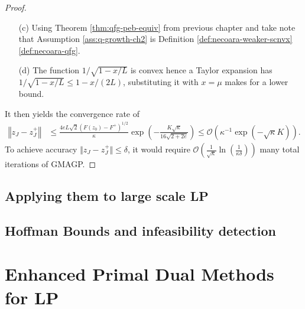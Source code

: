 \documentclass[12pt]{report}
\begin{document}
\begin{proof}
\begin{enumerate}
                \item [(c)] Using Theorem \ref{thm:qfg-peb-equiv} from previous chapter and take note that Assumption \ref{ass:q-growth-ch2} is Definition \ref{def:necoara-weaker-scnvx}\ref{def:necoara-qfg}. 
                \item [(d)] The function $1/\sqrt{1 - x/L}$ is convex hence a Taylor expansion has $1/\sqrt{1 - x/L} \le 1 - x/(2L) $, substituting it with $x = \mu$ makes for a lower bound. 
            \end{enumerate}
            It then yields the convergence rate of 
            \begin{align*}
                \left\Vert z_J - z^+_J\right\Vert 
                &\le \frac{4eL\sqrt{2}(F(z_0) - F^+)^{1/2}}{\kappa}
                \exp\left(
                    - \frac{K\sqrt{\kappa}}{16\sqrt{2 + 2e}}
                \right) 
                \le 
                \mathcal O\left(
                    \kappa^{-1}\exp\left(-\sqrt{\kappa}K\right)
                \right). 
            \end{align*}
            To achieve accuracy $\Vert z_J - z^+_J\Vert \le \delta$, it would require $\mathcal O\left(\frac{1}{\sqrt{\kappa}}\ln\left(\frac{1}{\kappa\delta}\right)\right)$ many total iterations of GMAGP. 
        \end{proof}
        
    
    \section{Applying them to large scale LP}
    
    \section{Hoffman Bounds and infeasibility detection}
    
\chapter{Enhanced Primal Dual Methods for LP}
    






\end{document}
